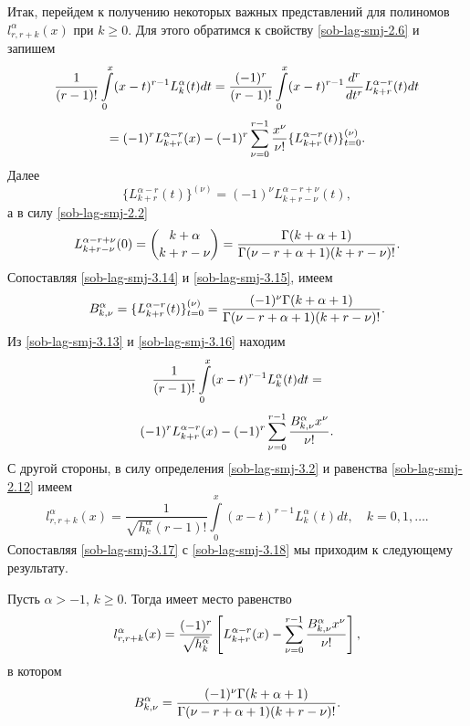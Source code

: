 Итак, перейдем к получению некоторых важных представлений для полиномов
$l_{r,r+k}^{\alpha}(x)$ при $k\ge0$. Для этого обратимся к свойству \eqref{sob-lag-smj-2.6} и запишем
 $$
 {1\over
(r-1)!}\int\limits_{0}^x(x-t)^{r-1}
     L^\alpha_k(t)dt=
{(-1)^r\over (r-1)!}\int\limits_{0}^x(x-t)^{r-1}
{d^r\over dt^r}L_{k+r}^{\alpha-r}(t)dt
     $$
 \begin{equation}\label{sob-lag-smj-3.13}
 =(-1)^rL_{k+r}^{\alpha-r}(x)-(-1)^r\sum_{\nu=0}^{r-1}
{x^\nu\over\nu!}\{L_{k+r}^{\alpha-r}(t)\}_{t=0}^{(\nu)}.
 \end{equation}
Далее
\begin{equation}\label{sob-lag-smj-3.14}
 \{L_{k+r}^{\alpha-r}(t)\}^{(\nu)}=(-1)^\nu
L_{k+r-\nu}^{\alpha-r+\nu}(t),
  \end{equation}
 а в силу \eqref{sob-lag-smj-2.2}
 \begin{equation}\label{sob-lag-smj-3.15}
L_{k+r-\nu}^{\alpha-r+\nu}(0)= {k+\alpha\choose
k+r-\nu}={\Gamma(k+\alpha+1)\over\Gamma(\nu-r+
\alpha+1)(k+r-\nu)!}.
\end{equation}
Сопоставляя \eqref{sob-lag-smj-3.14} и \eqref{sob-lag-smj-3.15}, имеем
\begin{equation}\label{sob-lag-smj-3.16}
B_{k,\nu}^\alpha=\{L_{k+r}^{\alpha-r}(t)\}^{(\nu)}_{t=0}=
{(-1)^\nu\Gamma(k+\alpha+1)\over\Gamma(\nu-r+ \alpha+1)(k+r-\nu)!}.
\end{equation}
Из \eqref{sob-lag-smj-3.13} и \eqref{sob-lag-smj-3.16} находим
$$
{1\over (r-1)!}\int\limits_{0}^x(x-t)^{r-1}
 L^\alpha_k(t)dt=
$$
\begin{equation}\label{sob-lag-smj-3.17}
(-1)^rL_{k+r}^{\alpha-r}(x)-
     (-1)^r\sum_{\nu=0}^{r-1}
{B_{k,\nu}^\alpha x^\nu\over\nu!}.
\end{equation}
С другой стороны, в силу определения \eqref{sob-lag-smj-3.2} и равенства \eqref{sob-lag-smj-2.12}    имеем
 \begin{equation}\label{sob-lag-smj-3.18}
l_{r,r+k}^{\alpha}(x) =\frac{1}{\sqrt{h_k^\alpha}(r-1)!}\int\limits_{0}^x(x-t)^{r-1}L_{k}^{\alpha}(t)dt, \quad k=0,1,\ldots.
\end{equation}
 Сопоставляя \eqref{sob-lag-smj-3.17} с \eqref{sob-lag-smj-3.18} мы приходим к следующему результату.
\begin{theorem}
Пусть $\alpha>-1$, $k\ge0$. Тогда имеет место равенство
\begin{equation}\label{sob-lag-smj-3.19}
l_{r,r+k}^{\alpha}(x)=\frac{(-1)^r}{\sqrt{h_k^\alpha}}\left[L_{k+r}^{\alpha-r}(x)-
     \sum_{\nu=0}^{r-1}
{B_{k,\nu}^\alpha x^\nu\over\nu!}\right],
\end{equation}
в котором
$$
B_{k,\nu}^\alpha={(-1)^\nu\Gamma(k+\alpha+1)\over\Gamma(\nu-r+ \alpha+1)(k+r-\nu)!}.
$$
\end{theorem}

